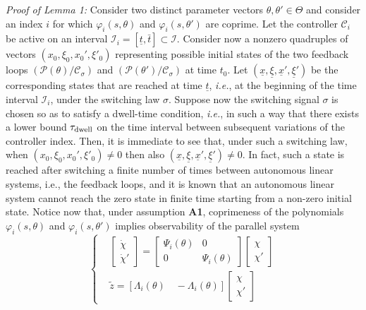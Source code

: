 \documentclass[letterpaper, 10 pt, conference]{ieeetran}
\begin{document}
{\em Proof of Lemma 1:} Consider two distinct parameter vectors $\theta, \theta' \in \Theta$ and consider an index $i$ for which $\varphi_i(s,\theta)$ and $\varphi_i(s,\theta')$
are coprime. Let the controller $\mathcal C_i$ be active on an interval $\mathcal I_i = [\underline t , \bar t] \subset \mathcal I$.
Consider now a nonzero quadruples of vectors $(x_0,\xi_0,x_0',\xi'_0)$ representing possible initial states of the two feedback loops $(\mathcal P (\theta) / \mathcal C_\sigma)$ 
and $(\mathcal P (\theta') / \mathcal C_\sigma)$ at time $t_0$. Let $(\underline x,\underline \xi, \underline x', \underline \xi')$ be the corresponding states 
that are reached at time $\underline t$, \emph{i.e.}, at the beginning of the time
interval $\mathcal I_i$, under the switching law $\sigma$. Suppose now the switching signal $\sigma$ is chosen so as to satisfy a dwell-time condition, \emph{i.e.}, in such a way that there exists a lower bound
$\tau_{\rm dwell}$ on the time interval between subsequent variations of the controller index. Then, it is immediate to see that, under such a switching law, 
when $(x_0,\xi_0,x_0',\xi'_0) \ne 0$ then also $(\underline x,\underline \xi, \underline x', \underline \xi') \ne 0$. In fact, such a state is reached after switching a finite number of times between 
autonomous linear systems, i.e., the feedback loops, and
it is known that an autonomous linear system cannot reach the zero state in finite time starting from a non-zero initial state. Notice now that, under assumption \textbf{A1}, coprimeness of
the polynomials $\varphi_i(s,\theta)$ and $\varphi_i(s,\theta')$ implies observability of the parallel system
\[
\left \{ \begin{split}
& \left [ \begin{array}{c} \dot \chi \\ \dot \chi' \end{array}  \right ] = \left [ \begin{array}{cc} \Psi_i (\theta) & 0 \\ 0 & \Psi_i (\theta)  \end{array}  \right ]
\left [ \begin{array}{c} \chi \\ \chi' \end{array}  \right ] \\
& \tilde z = \left[ \Lambda_i (\theta) \quad -  \Lambda_i (\theta) \right ] \left [  \begin{array}{c} \chi \\ \chi' \end{array}  \right ] 
\end{split}
\right .
\]
\end{document}
